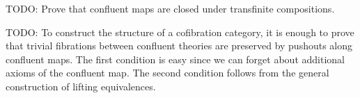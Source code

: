 \documentclass[reqno]{amsart}
\theoremstyle{definition}
\theoremstyle{remark}
\newcommand{\I}{\mathrm{I}}
\newcommand{\class}[2]{#1\text{-}\mathrm{#2}}
\newcommand{\Icell}[1][\I]{\class{#1}{cell}}
\numberwithin{figure}{section}
\begin{document}
\begin{comment}
We will say that a map of theories is \emph{confluent} if it isomorphic to a composite of the form $T \to T' \to (T',R)$ such that the following conditions hold:
\begin{enumerate}
\item The theory $T$ is a subtheory of $T'$ and the map $T \to T'$ is the obvious inclusion.
\item The map $T \to T'$ is a relative $\Icell$ complex.
\item The relation $R$ is confluent.
\item If $R(t,s)$, then $t$ consists of function symbols that do not belong to $T$.
\item If $R(t,s)$, then $t\!\downarrow\ \sststile{T'}{V} s\!\downarrow$.
\item If $R(t,s)$, then $t\!\downarrow\ \sststile{(T',R)}{V} e_p(t) = e_p(s)$.
\end{enumerate}

We will say that a theory $T$ is \emph{confluent} if the map $0 \to T$ is confluent.
\end{defn}

\begin{lem}
Let $T \to T' \to (T',R)$ be a confluent map.
If sequents $\varphi \sststile{(T',R)}{V} t_1 = t_2$ and $\varphi \sststile{T'}{V} t_1\!\downarrow \land\ t_2\!\downarrow$ are derivable,
then there exists a term $s$ such that $t_1 \Rightarrow_{R'}^* s$ and $t_2 \Rightarrow_{R'}^* s$, where $R'$ is the union of $R$ and the relation $\varphi \sststile{T'}{V} - = -$.
\end{lem}
\begin{proof}
TODO
\end{proof}

\begin{lem}
If $f : T \to (T',R)$ is a confluent map and $f(\varphi) \sststile{(T',R)}{V} f(\psi)$, then $\varphi \sststile{T}{V} \psi$.
\end{lem}
\begin{proof}
TODO
\end{proof}
\end{comment}

TODO: Prove that confluent maps are closed under transfinite compositions.

TODO: To construct the structure of a cofibration category, it is enough to prove that trivial fibrations between confluent theories are preserved by pushouts along confluent maps. The first condition is easy since we can forget about additional axioms of the confluent map. The second condition follows from the general construction of lifting equivalences.
\end{document}
